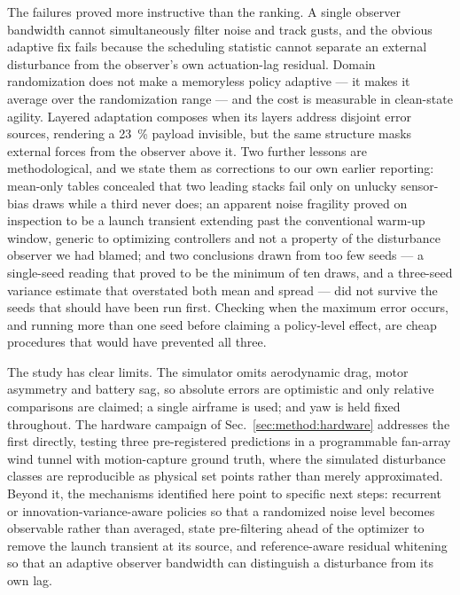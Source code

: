 The failures proved more instructive than the ranking. A single observer bandwidth
cannot simultaneously filter noise and track gusts, and the obvious adaptive fix fails
because the scheduling statistic cannot separate an external disturbance from the
observer's own actuation-lag residual. Domain randomization does not make a memoryless
policy adaptive --- it makes it average over the randomization range --- and the cost is
measurable in clean-state agility. Layered adaptation composes when its layers address
disjoint error sources, rendering a \SI{23}{\percent} payload invisible, but the same
structure masks external forces from the observer above it. Two further lessons are
methodological, and we state them as corrections to our own earlier reporting: mean-only
tables concealed that two leading stacks fail only on unlucky sensor-bias draws while a
third never does; an apparent noise fragility proved on inspection to be a launch
transient extending past the conventional warm-up window, generic to optimizing
controllers and not a property of the disturbance observer we had blamed; and two
conclusions drawn from too few seeds --- a single-seed reading that proved to be the
minimum of ten draws, and a three-seed variance estimate that overstated both mean and
spread --- did not survive the seeds that should have been run first. Checking when the
maximum error occurs, and running more than one seed before claiming a policy-level
effect, are cheap procedures that would have prevented all three.

The study has clear limits. The simulator omits aerodynamic drag, motor asymmetry and
battery sag, so absolute errors are optimistic and only relative comparisons are
claimed; a single airframe is used; and yaw is held fixed throughout. The hardware
campaign of Sec.~\ref{sec:method:hardware} addresses the first directly, testing three
pre-registered predictions in a programmable fan-array wind tunnel with motion-capture
ground truth, where the simulated disturbance classes are reproducible as physical set
points rather than merely approximated. Beyond it, the mechanisms identified here point
to specific next steps: recurrent or innovation-variance-aware policies so that a
randomized noise level becomes observable rather than averaged, state pre-filtering ahead
of the optimizer to remove the launch transient at its source, and reference-aware
residual whitening so that an adaptive observer bandwidth can distinguish a disturbance
from its own lag.
